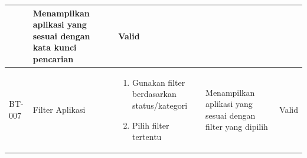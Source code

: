 \begin{table}[h]
\begin{adjustbox}{width=\textwidth}
\begin{tabular}{|p{0.8cm}|p{2.2cm}|p{4cm}|p{3.5cm}|p{1.2cm}|}
\begin{enumerate}[leftmargin=*,noitemsep,topsep=0pt,label=\arabic*.,widest=99]
                                                      \end{enumerate} & Menampilkan aplikasi yang sesuai dengan kata kunci pencarian       & Valid                                                            \\ \hline
      BT-007            & Filter Aplikasi           & \begin{enumerate}[leftmargin=*,noitemsep,topsep=0pt,label=\arabic*.,widest=99]
                                                        \item Gunakan filter berdasarkan status/kategori
                                                        \item Pilih filter tertentu
                                                      \end{enumerate} & Menampilkan aplikasi yang sesuai dengan filter yang dipilih        & Valid                                                            \\ \hline
    \end{tabular}
  \end{adjustbox}
\end{table}


